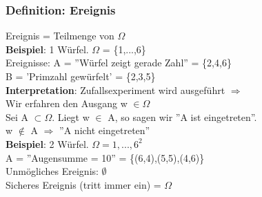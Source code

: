 \subsubsection{Definition: Ereignis}
Ereignis = Teilmenge von $\Omega$\\
\textbf{Beispiel}: 1 Würfel. $\Omega$ = \{1,...,6\}\\
Ereignisse: A = ''Würfel zeigt gerade Zahl'' = \{2,4,6\}\\
B = 'Primzahl gewürfelt' = \{2,3,5\}\medskip\\
\textbf{Interpretation}: Zufallsexperiment wird ausgeführt $\Rightarrow$ \\
Wir erfahren den Ausgang w $\in \Omega$\\
Sei A $\subset \Omega$. Liegt w $\in$ A, so sagen wir ''A ist eingetreten''. \\
w $\notin$ A $\Rightarrow$ ''A nicht eingetreten''\medskip\\
\textbf{Beispiel}: 2 Würfel. $\Omega = {1,...,6}^2$\\
A = ''Augensumme  = 10'' = \{(6,4),(5,5),(4,6)\}\medskip\\
Unmögliches Ereignis: $\emptyset$\\
Sicheres Ereignis (tritt immer ein) = $\Omega$\newpage
